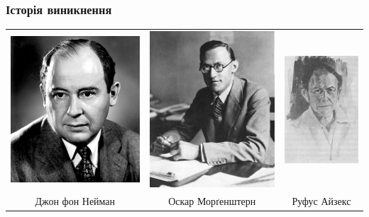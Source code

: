 \documentclass[10pt,pdf,aspectratio=169]{beamer}
\begin{document}
    \begin{frame}
        \frametitle{Історія виникнення}
        \begin{tabular}{c c c}
            \includegraphics[scale=0.275]{../pics/John_von_Neumann.jpg} &
            \includegraphics[scale=0.4]{../pics/Oskar_Morgenstern.jpg} &
            \includegraphics[scale=0.42]{../pics/Rufus_Isaacs.jpg} \\
            Джон фон Нейман &
            Оскар Морґенштерн &
            Руфус Айзекс
        \end{tabular}
    \end{frame}
\end{document}
